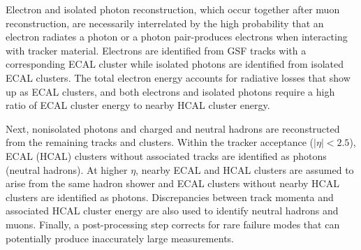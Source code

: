 Electron and isolated photon reconstruction, which occur together after muon reconstruction, are necessarily interrelated by the high probability that an electron radiates a photon or a photon pair-produces electrons when interacting with tracker material. Electrons are identified from GSF tracks with a corresponding ECAL cluster while isolated photons are identified from isolated ECAL clusters. The total electron energy accounts for radiative losses that show up as ECAL clusters, and both electrons and isolated photons require a high ratio of ECAL cluster energy to nearby HCAL cluster energy.

Next, nonisolated photons and charged and neutral hadrons are reconstructed from the remaining tracks and clusters. Within the tracker acceptance ($|\eta|<2.5$), ECAL (HCAL) clusters without associated tracks are identified as photons (neutral hadrons). At higher $\eta$, nearby ECAL and HCAL clusters are assumed to arise from the same hadron shower and ECAL clusters without nearby HCAL clusters are identified as photons. Discrepancies between track momenta and associated HCAL cluster energy are also used to identify neutral hadrons and muons. Finally, a post-processing step corrects for rare failure modes that can potentially produce inaccurately large \ptmiss measurements.

